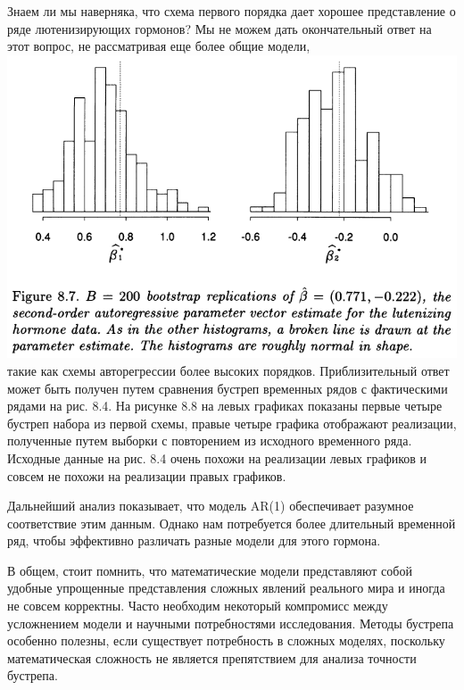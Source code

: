 Знаем ли мы наверняка, что схема первого порядка дает хорошее представление о ряде лютенизирующих гормонов? Мы не можем дать окончательный ответ на этот вопрос, не рассматривая еще более общие модели,
\\[0.5cm]
\noindent
\includegraphics[width=\linewidth]{8/f87}
\newline
такие как схемы авторегрессии более высоких порядков. Приблизительный ответ может быть получен путем сравнения бустреп временных рядов с фактическими рядами на рис. 8.4. На рисунке 8.8 на левых графиках показаны первые четыре бустреп набора из первой схемы, правые четыре графика отображают реализации, полученные путем выборки с повторением из исходного временного ряда. Исходные данные на рис. 8.4 очень похожи на реализации левых графиков и совсем не похожи на реализации правых графиков.

Дальнейший анализ показывает, что модель AR(1) обеспечивает разумное соответствие этим данным. Однако нам потребуется более длительный временной ряд, чтобы эффективно различать разные модели для этого гормона.

В общем, стоит помнить, что математические модели представляют собой удобные упрощенные представления сложных явлений реального мира и иногда не совсем корректны. Часто необходим некоторый компромисс между усложнением модели и научными потребностями исследования. Методы бустрепа особенно полезны, если существует потребность в сложных моделях, поскольку математическая сложность не является препятствием для анализа точности бустрепа.\\